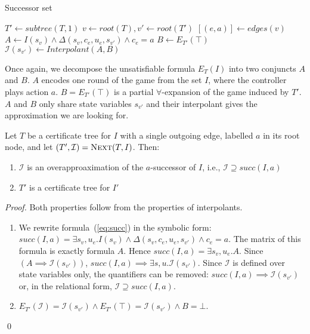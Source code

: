 \begin{algorithm}[t]
   \caption{Successor set}\label{alg:next}
   \begin{algorithmic}[1]
            \State $T' \gets subtree(T, 1)$
            \State $v \gets root(T), v' \gets root(T')$
            \State $[(e,a)] \gets edges(v)$
            \State $A \gets I(s_v) \land  \Delta(s_v, c_e, u_e, s_{v'}) \land c_e = a$\label{alg:strat:partition:Ai}
            \State $B \gets E_{T'}(\top)$\label{alg:strat:partition:Bi}
            \State $\mathcal{I}(s_{v'}) \gets Interpolant(A, B)$\label{alg:strat:partition:I}
            \State {} \label{alg:strat:partition:return}
        \EndFunction
    \end{algorithmic}
\end{algorithm}

Once again, we decompose the unsatisfiable formula $E_T(I)$ into
two conjuncts $A$ and $B$.  $A$ encodes one round of the game
from the set $I$, where the controller plays action $a$.
$B = E_{T'}(\top)$ is a partial $\forall$-expansion of the game induced by $T'$.
$A$ and $B$ only share state variables $s_{v'}$ and their interpolant
gives the approximation we are looking for.

\begin{proposition}
    Let $T$ be a certificate tree for $I$ with a single outgoing
    edge, labelled $a$ in its root node, and let $(T',\mathcal{I})
    = \textsc{Next}(T,I)$.
    Then:
    \begin{enumerate}
        \item $\mathcal{I}$ is an overapproaximation of the
            $a$-successor of $I$, i.e., $\mathcal{I} \supseteq
            succ(I, a)$
        \item $T'$ is a certificate tree for $I'$
    \end{enumerate}
\end{proposition}
\begin{proof}
Both properties follow from the properties of interpolants.
\begin{enumerate}
    \item We rewrite formula~(\ref{eq:succ}) in the symbolic form:
        $succ(I, a) = \exists s_v,u_e. I(s_v) \land
        \Delta(s_v,c_e,u_e,s_{v'}) \land c_e = a$.  The matrix of
        this formula is exactly formula $A$.  Hence $succ(I,a) =
        \exists s_v,u_e. A$.  Since $(A\implies
        \mathcal{I}(s_{v'}))$, $succ(I,a) \implies \exists s,u.
        \mathcal{I}(s_{v'})$.  Since $\mathcal{I}$ is defined over
        state variables only, the quantifiers can be removed:
        $succ(I,a) \implies \mathcal{I}(s_{v'})$ or, in the
        relational form, $\mathcal{I} \supseteq succ(I, a)$.

    \item $E_{T'}(\mathcal{I}) = \mathcal{I}(s_{v'}) \land
        E_{T'}(\top) = \mathcal{I}(s_{v'}) \land B = \bot$.
\end{enumerate}
    \qed
\end{proof}
